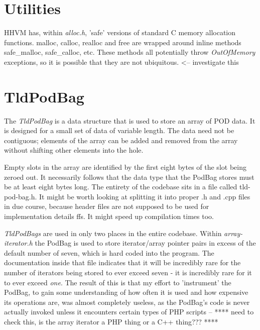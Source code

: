 \section{Utilities}
HHVM has, within \emph{alloc.h}, 'safe' versions of standard C memory allocation functions. malloc, calloc, realloc and free are wrapped around inline methods safe\_malloc, safe\_calloc, etc. These methods all potentially throw \emph{OutOfMemory} exceptions, so it is possible that they are not ubiquitous. <-- investigate this

\section{TldPodBag}

The \emph{TldPodBag} is a data structure that is used to store an array of POD data. It is designed for a small set of data of variable length. The data need not be contiguous; elements of the array can be added and removed from the array without shifting other elements into the hole.

Empty slots in the array are identified by the first eight bytes of the slot being zeroed out. It necessarily follows that the data type that the PodBag stores must be at least eight bytes long.
The entirety of the codebase sits in a file called tld-pod-bag.h. It might be worth looking at splitting it into proper .h and .cpp files in due course, because header files are not supposed to be used for implementation details ffs. It might speed up compilation times too.

\emph{TldPodBags} are used in only two places in the entire codebase. Within \emph{array-iterator.h} the PodBag is used to store iterator/array pointer pairs in excess of the default number of seven, which is hard coded into the program. The documentation inside that file indicates that it will be incredibly rare for the number of iterators being stored to ever exceed seven - it is incredibly rare for it to ever exceed \emph{one}. The result of this is that my effort to 'instrument' the PodBag, to gain some understanding of how often it is used and how expensive its operations are, was almost completely useless, as the PodBag's code is never actually invoked unless it encounters certain types of PHP scripts -- **** need to check this, is the array iterator a PHP thing or a C++ thing??? ****



